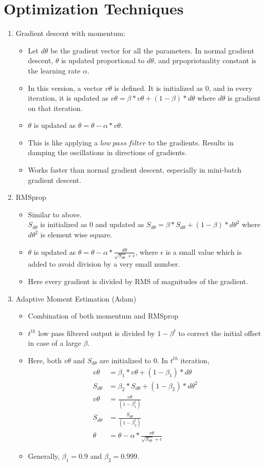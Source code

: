 \documentclass{article}
\begin{document}
\section{Optimization Techniques}
\begin{enumerate}
	\item Gradient descent with momentum:\begin{itemize}
		\item Let $d\theta$ be the gradient vector for all the parameters. In normal gradient descent, $\theta$ is updated proportional to $d\theta$, and prpopriotnality constant is the learning rate $\alpha$.
		\item In this version, a vector $v\theta$ is defined. It is initialized as 0, and in every iteration, it is updated as $v\theta = \beta*v\theta + (1-\beta)*d\theta$ where $d\theta$ is gradient on that iteration.
		\item $\theta$ is updated as $\theta = \theta -\alpha*v\theta$.
		\item This is like applying a $low\ pass\ filter$ to the gradients. Results in damping the oscillations in directions of gradients.
		\item Works faster than normal gradient descent, especially in mini-batch gradient descent.
	\end{itemize}
	\item RMSprop\begin{itemize}
		\item Similar to above.\\$S_{d\theta}$ is initialized as 0 and updated as $S_{d\theta} = \beta*S_{d\theta} + (1-\beta)*d\theta^2$ where $d\theta^2$ is element wise square.
		\item $\theta$ is updated as $\theta = \theta - \alpha * \frac{d\theta}{\sqrt{S_{d\theta}}+\epsilon}$, where $\epsilon$ is a small value which is added to avoid division by a very small number.
		\item Here every gradient is divided by RMS of magnitudes of the gradient.
	\end{itemize}
	\item Adaptive Moment Estimation (Adam)\begin{itemize}
		\item Combination of both momentum and RMSprop
		\item $t^{th}$ low pass filtered output is divided by $1-\beta^t$ to correct the initial offset in case of a large $\beta$.
		\item Here, both $v\theta$ and $S_{d\theta}$ are initialized to 0. In $t^{th}$ iteration,\begin{align*}
			v\theta &= \beta_1*v\theta+(1-\beta_1)*d\theta\\
			S_{d\theta} &= \beta_2*S_{d\theta} + (1-\beta_2)*d\theta^2\\
			v\theta &= \frac{v\theta}{(1-\beta_1^t)}\\
			S_{d\theta} &= \frac{S_{d\theta}}{(1-\beta_2^t)}\\
			\theta &= \theta - \alpha*\frac{v\theta}{\sqrt{S_{d\theta}}+\epsilon}
		\end{align*}
		\item Generally, $\beta_1=0.9$ and $\beta_2=0.999$.


\end{itemize}
\end{enumerate}
\end{document}
